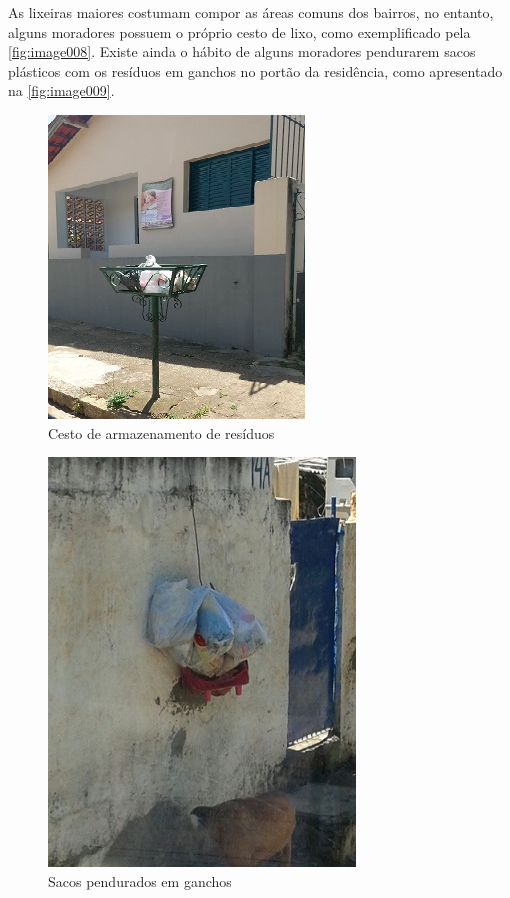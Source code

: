 		 	
	As lixeiras maiores costumam compor as áreas comuns dos bairros, no entanto, alguns moradores possuem o próprio cesto de lixo, como exemplificado pela \autoref{fig:image008}. Existe ainda o hábito de alguns moradores pendurarem sacos plásticos com os resíduos em ganchos no portão da residência, como apresentado na \autoref{fig:image009}.
	
	\begin{figure}
		\centering
		\includegraphics[width=0.5\linewidth]{produtos/prodtres/image008}
		\caption{Cesto de armazenamento de resíduos}
		\label{fig:image008}
	\end{figure}	
		
				
	\begin{figure}
		\centering
		\includegraphics[width=0.5\linewidth]{produtos/prodtres/image009}
		\caption{Sacos pendurados em ganchos}
		\label{fig:image009}
	\end{figure}
		
